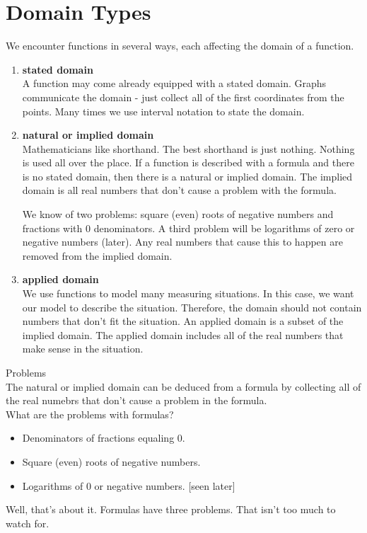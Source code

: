 \documentclass{ximera}
\begin{document}
\section{Domain Types}

We encounter functions in several ways, each affecting the domain of a function.

\begin{enumerate}
\item  \textbf{stated domain} \\
A function may come already equipped with a stated domain.  Graphs communicate the domain - just collect all of the first coordinates from the points. Many times we use interval notation to state the domain.


\item  \textbf{natural or implied domain} \\
Mathematicians like shorthand. The best shorthand is just nothing.  Nothing is used all over the place. If a function is described with a formula and there is no stated domain, then there is a natural or implied domain.  The implied domain is all real numbers that don't cause a problem with the formula.

We know of two problems: square (even) roots of negative numbers and fractions with $0$ denominators.  A third problem will be logarithms of zero or negative numbers (later). Any real numbers that cause this to happen are removed from the implied domain.


\item  \textbf{applied domain} \\
We use functions to model many measuring situations. In this case, we want our model to describe the situation.  Therefore, the domain should not contain numbers that don't fit the situation. An applied domain is a subset of the implied domain.  The applied domain includes all of the real numbers that make sense in the situation.

\end{enumerate}




\begin{warning} Problems \\

The natural or implied domain can be deduced from a formula by collecting all of the real numebrs that don't cause a problem in the formula. \\

What are the problems with formulas?

\begin{itemize}
\item  Denominators of fractions equaling $0$. \\
\item  Square (even) roots of negative numbers.    \\
\item  Logarithms of $0$ or negative numbers.  [seen later] 
\end{itemize}

Well, that's about it.  Formulas have three problems.  That isn't too much to watch for.


\end{warning}
\end{document}
